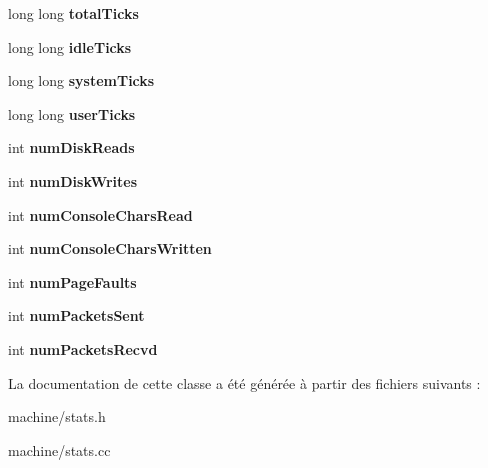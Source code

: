 \begin{DoxyCompactItemize}
\item 
\hypertarget{class_statistics_a58b71304ed886f7b6bf4f0a098de95d6}{}\label{class_statistics_a58b71304ed886f7b6bf4f0a098de95d6} 
long long {\bfseries total\+Ticks}
\item 
\hypertarget{class_statistics_a93f73fe07546a65cccc257fe36d22f7d}{}\label{class_statistics_a93f73fe07546a65cccc257fe36d22f7d} 
long long {\bfseries idle\+Ticks}
\item 
\hypertarget{class_statistics_a1b863346650d845fd66c2a82edc821b3}{}\label{class_statistics_a1b863346650d845fd66c2a82edc821b3} 
long long {\bfseries system\+Ticks}
\item 
\hypertarget{class_statistics_abf5ff8cdf5bca15c2a48eb48e11a15a8}{}\label{class_statistics_abf5ff8cdf5bca15c2a48eb48e11a15a8} 
long long {\bfseries user\+Ticks}
\item 
\hypertarget{class_statistics_a50d57d5c9a5a6b07aa22ad8362259f9e}{}\label{class_statistics_a50d57d5c9a5a6b07aa22ad8362259f9e} 
int {\bfseries num\+Disk\+Reads}
\item 
\hypertarget{class_statistics_a5c1854b002d360cdb1dff4438fa6e30f}{}\label{class_statistics_a5c1854b002d360cdb1dff4438fa6e30f} 
int {\bfseries num\+Disk\+Writes}
\item 
\hypertarget{class_statistics_ab5ea51542ab83433169760d71452a305}{}\label{class_statistics_ab5ea51542ab83433169760d71452a305} 
int {\bfseries num\+Console\+Chars\+Read}
\item 
\hypertarget{class_statistics_a67aa7a06b0933ad257608174f3123e6e}{}\label{class_statistics_a67aa7a06b0933ad257608174f3123e6e} 
int {\bfseries num\+Console\+Chars\+Written}
\item 
\hypertarget{class_statistics_a0178d49a84e5dcc4a7672dc973e8f586}{}\label{class_statistics_a0178d49a84e5dcc4a7672dc973e8f586} 
int {\bfseries num\+Page\+Faults}
\item 
\hypertarget{class_statistics_a7ccdb4de272140b26cf54efc5dec5cf0}{}\label{class_statistics_a7ccdb4de272140b26cf54efc5dec5cf0} 
int {\bfseries num\+Packets\+Sent}
\item 
\hypertarget{class_statistics_a0907df803623b828b76be1efba2d3c56}{}\label{class_statistics_a0907df803623b828b76be1efba2d3c56} 
int {\bfseries num\+Packets\+Recvd}
\end{DoxyCompactItemize}


La documentation de cette classe a été générée à partir des fichiers suivants \+:\begin{DoxyCompactItemize}
\item 
machine/stats.\+h\item 
machine/stats.\+cc\end{DoxyCompactItemize}
